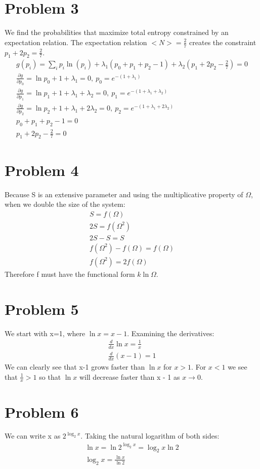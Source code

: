 \documentclass[a4paper,12pt]{article}
\numberwithin{equation}{section}
\begin{document}
\section{Problem 3}
We find the probabilities that maximize total entropy constrained by an expectation relation.
The expectation relation $<N>=\frac{2}{7}$ creates the constraint $p_1+2p_2=\frac{2}{7}$.
\begin{gather}
 g(p_i)=\sum_i p_i\ln(p_i) + \lambda_1(p_0+p_1+p_2-1)+\lambda_2(p_1+2p_2-\frac{2}{7})=0\\
 \frac{\partial g}{\partial p_0} = \ln{p_0}+1+\lambda_1=0,\ p_0=e^{-(1+\lambda_1)}\\
 \frac{\partial g}{\partial p_1} = \ln{p_1}+1+\lambda_1+\lambda_2=0,\ p_1=e^{-(1+\lambda_1+\lambda_2)}\\
 \frac{\partial g}{\partial p_2} = \ln{p_2}+1+\lambda_1+2\lambda_2=0,\ p_2=e^{-(1+\lambda_1+2\lambda_2)}\\
 p_0+p_1+p_2-1=0\\
 p_1+2p_2-\frac{2}{7}=0
\end{gather}

\section{Problem 4}
Because S is an extensive parameter and using the multiplicative property of $\Omega$, when we double the size of the system:
\begin{gather}
 S=f(\Omega)\\
 2S=f(\Omega^2)\\
 2S-S=S\\
 f(\Omega^2)-f(\Omega)=f(\Omega)\\
 f(\Omega^2)=2f(\Omega)
\end{gather}
Therefore f must have the functional form $k\ln{\Omega}$.

\section{Problem 5}
We start with x=1, where $\ln{x}=x-1$. 
Examining the derivatives:
\begin{gather}
 \frac{d}{dx}\ln{x}=\frac{1}{x}\\
 \frac{d}{dx}(x-1)=1
\end{gather}
We can clearly see that x-1 grows faster than $\ln{x}$ for $x > 1$. 
For $x < 1$ we see that $\frac{1}{x}>1$ so that $\ln{x}$ will decrease faster than x - 1 as $x\rightarrow 0$.

\section{Problem 6}
We can write x as $2^{\log_2{x}}$. Taking the natural logarithm of both sides:
\begin{gather}
 \ln{x}=\ln{ 2^{\log_2{x}} }=\log_2{x}\ln{2}\\
 \log_2{x}=\frac{\ln{x}}{\ln{2}}
\end{gather}
\end{document}
